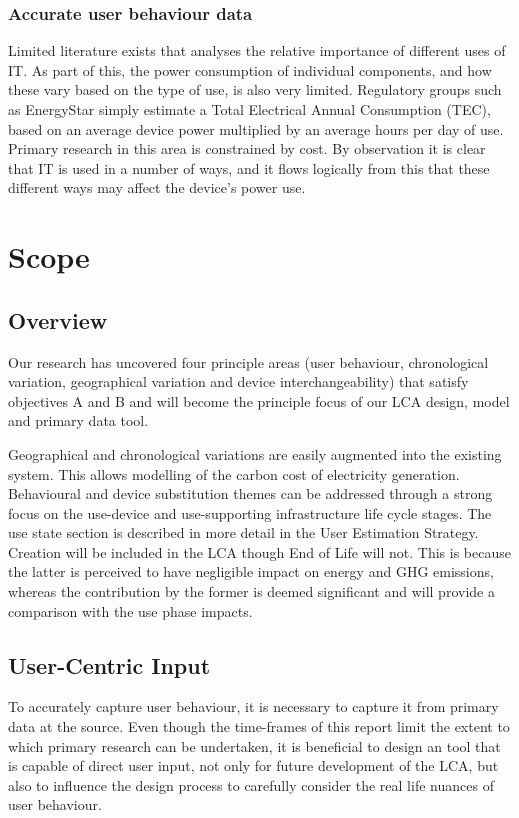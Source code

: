 \documentclass[conference]{IEEEtran}
\begin{document}
\subsubsection{Accurate user behaviour data}

Limited literature exists that analyses the relative importance of
different uses of IT. As part of this, the power consumption of
individual components, and how these vary based on the type of use, is
also very limited. Regulatory groups such as EnergyStar simply
estimate a Total Electrical Annual Consumption (TEC), based on an
average device power multiplied by an average hours per day of
use. Primary research in this area is constrained by cost. By
observation it is clear that IT is used in a number of ways, and it
flows logically from this that these different ways may affect the
device’s power use.


\section{Scope}

\subsection{Overview}

Our research has uncovered four principle areas (user behaviour,
chronological variation, geographical variation and device
interchangeability) that satisfy objectives A and B and will become
the principle focus of our LCA design, model and primary data
tool.

Geographical and chronological variations are easily augmented into
the existing system. This allows modelling of the carbon cost of
electricity generation. Behavioural and device substitution themes can
be addressed through a strong focus on the use-device and
use-supporting infrastructure life cycle stages. The use state section
is described in more detail in the User Estimation Strategy. Creation
will be included in the LCA though End of Life will not. This is
because the latter is perceived to have negligible impact on energy
and GHG emissions, whereas the contribution by the former is deemed
significant and will provide a comparison with the use phase impacts.

\subsection{User-Centric Input}

To accurately capture user behaviour, it is necessary to capture it
from primary data at the source. Even though the time-frames of this
report limit the extent to which primary research can be undertaken,
it is beneficial to design an tool that is capable of direct user
input, not only for future development of the LCA, but also to
influence the design process to carefully consider the real life
nuances of user behaviour.
\end{document}
